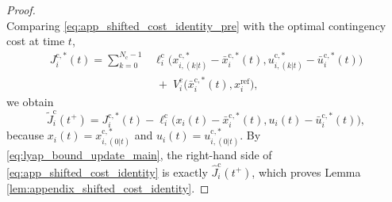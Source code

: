 \documentclass[twocolumn]{autart}
\begin{document}
\begin{proof}
\begin{equation}
\label{eq:app_shifted_cost_identity_pre}
\end{equation}
Comparing \eqref{eq:app_shifted_cost_identity_pre} with the optimal contingency cost at time $t$,
\begin{equation}
\begin{aligned}
J_i^{\mathrm c,\ast}(t)
=
\sum_{k=0}^{N_{\mathrm c}-1}
&\ell_i^{\mathrm c}\!\Big(
x_{i,(k|t)}^{\mathrm c,\ast}-\bar x_i^{\mathrm c,\ast}(t),
u_{i,(k|t)}^{\mathrm c,\ast}-\bar u_i^{\mathrm c,\ast}(t)
\Big)
\\
&\;+\;
V_i^{\mathrm c}\!\bigl(\bar x_i^{\mathrm c,\ast}(t),x_i^{\mathrm{ref}}\bigr),
\end{aligned}
\label{eq:app_opt_cost_t}
\end{equation}
we obtain
\begin{equation}
\tilde J_i^{\mathrm c}(t^+)
=
J_i^{\mathrm c,\ast}(t)
-
\ell_i^{\mathrm c}\!\Big(
x_i(t)-\bar x_i^{\mathrm c,\ast}(t),
u_i(t)-\bar u_i^{\mathrm c,\ast}(t)
\Big),
\label{eq:app_shifted_cost_identity}
\end{equation}
because $x_i(t)=x_{i,(0|t)}^{\mathrm c,\ast}$ and $u_i(t)=u_{i,(0|t)}^{\mathrm c,\ast}$.
By \eqref{eq:lyap_bound_update_main}, the right-hand side of \eqref{eq:app_shifted_cost_identity} is exactly $\hat J_i^{\mathrm c}(t^+)$, which proves Lemma \ref{lem:appendix_shifted_cost_identity}.
\end{proof}
\end{document}
